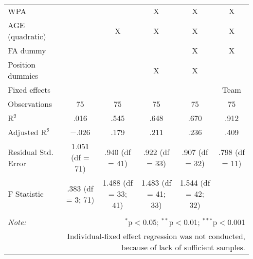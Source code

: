 \begin{table}[H]
\begin{tabular}{@{\extracolsep{5pt}}lccccc}
WPA & & & X & X & X \\
AGE (quadratic) &  & X & X & X & X \\
FA dummy &  &  &  & X & X \\
Position dummies &  &  & X & X &  \\
Fixed effects &  &  &  &  & Team \\
Observations & 75 & 75 & 75 & 75 & 75 \\
R$^{2}$ & .016 & .545 & .648 & .670 & .912 \\
Adjusted R$^{2}$ & $-$.026 & .179 & .211 & .236 & .409 \\
Residual Std. Error & 1.051 (df = 71) & .940 (df = 41) & .922 (df = 33) & .907 (df = 32) & .798 (df = 11) \\
F Statistic & .383 (df = 3; 71) & 1.488 (df = 33; 41) & 1.483 (df = 41; 33) & 1.544 (df = 42; 32) &  \\
\hline
\hline \\[-1.8ex]
\textit{Note:}  & \multicolumn{5}{r}{$^{*}$p$<$0.05; $^{**}$p$<$0.01; $^{***}$p$<$0.001} \\
& \multicolumn{5}{r}{Individual-fixed effect regression was not conducted, because of lack of sufficient samples.} \\
\end{tabular}
\end{table}
